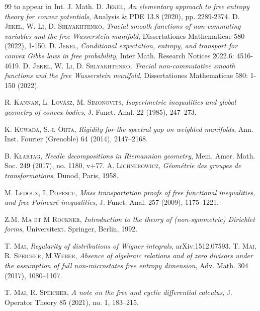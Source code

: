 \documentclass[10pt,a4paper,reqno]{amsart}
\begin{document}
\begin{thebibliography}{99}
to appear in  Int. J. Math.
\textsc{D. Jekel},
\textit{An elementary approach to free entropy theory for convex potentials},
Analysis \& PDE 13.8 (2020), pp. 2289-2374.
\textsc{D. Jekel, W. Li, D. Shlyakhtenko},
\textit{Tracial smooth functions of non-commuting variables and the free Wasserstein manifold},
Dissertationes Mathematicae 580 (2022), 1-150.
\textsc{D. Jekel}, 
\textit{Conditional expectation, entropy, and transport for convex Gibbs laws in free probability}, 
Inter Math. Research Notices 2022.6: 4516-4619.
\textsc{D. Jekel, W. Li, D. Shlyakhtenko}, 
\textit{Tracial non-commutative smooth functions and the free Wasserstein manifold}, 
Dissertationes Mathematicae 580: 1-150 (2022).



\textsc{R. Kannan, L. Lovász, M. Simonovits}, 
\textit{Isoperimetric inequalities and global geometry of convex bodies}, 
J. Funct. Anal. 22 (1985), 247–273.

\textsc{K. Kuwada, S.-i. Ohta}, 
\textit{Rigidity for the spectral gap on weighted manifolds}, 
Ann. Inst. Fourier (Grenoble) 64 (2014), 2147–2168.

\textsc{B. Klartag}, 
\textit{Needle decompositions in Riemannian geometry}, 
Mem. Amer. Math. Soc. 249 (2017), no. 1180, v+77.
\textsc{A. Lichnerowicz}, 
\textit{Géométrie des groupes de transformations}, 
Dunod, Paris, 1958.



\textsc{M. Ledoux, I. Popescu}, 
\textit{Mass transportation proofs of free functional inequalities, and free Poincaré inequalities}, 
J. Funct. Anal. 257 (2009), 1175–1221.

\textsc{Z.M. Ma et M R\"ockner},
\textit{Introduction to the theory of (non-symmetric) Dirichlet
forms},
Universitext. Springer, Berlin, 1992.



\textsc{T. Mai}, 
\textit{Regularity of distributions of Wigner integrals}, 
arXiv:1512.07593.
\textsc{T. Mai, R. Speicher, M.Weber}, 
\textit{Absence of algebraic relations and of zero divisors under the assumption of full non-microstates free entropy dimension}, 
Adv. Math. 304 (2017), 1080–1107.

\textsc{T. Mai, R. Speicher}, 
\textit{A note on the free and cyclic differential calculus}, 
J. Operator Theory 85 (2021), no. 1, 183–215.






\end{thebibliography}
\end{document}
